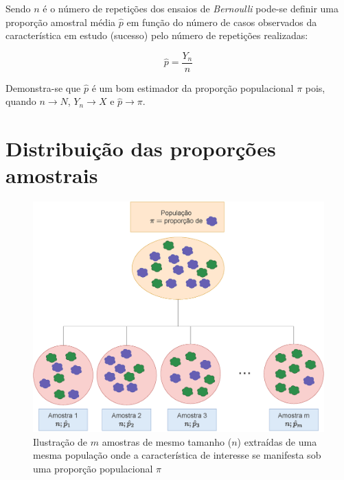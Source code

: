 \documentclass[
]{book}
\begin{document}
\hfill\break

Sendo \(n\) é o número de repetições dos ensaios de \emph{Bernoulli} pode-se definir uma proporção amostral média \(\hat{p}\) em função do número de casos observados da característica em estudo (sucesso) pelo número de repetições realizadas:

\hfill\break

\[
\hat{p} = \frac{Y_{n}}{n}
\]

\hfill\break

Demonstra-se que \(\hat{p}\) é um bom estimador da proporção populacional \(\pi\) pois, quando \(n\to N\), \(Y_{n}\to X\) e \(\hat{p}\to \pi\).

\hfill\break

\hypertarget{distribuiuxe7uxe3o-das-proporuxe7uxf5es-amostrais}{%
\section{Distribuição das proporções amostrais}\label{distribuiuxe7uxe3o-das-proporuxe7uxf5es-amostrais}}

\begin{figure}

{\centering \includegraphics[width=1\linewidth]{images10/dist_amostral_prop} 

}

\caption{Ilustração de $m$ amostras de mesmo tamanho ($n$) extraídas de uma mesma população onde a característica de interesse se manifesta sob uma proporção populacional $\pi$}\label{fig:fig64}
\end{figure}
\end{document}
